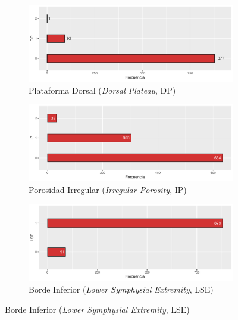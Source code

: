 \begin{figure}[p]
    \ContinuedFloat

    \begin{subfigure}{\textwidth}
        \includegraphics[width=\linewidth]{../../scripts/eda/eda_univar/char_dp_distr.pdf}
        \caption{Plataforma Dorsal (\textit{Dorsal Plateau}, DP)}
        \label{fig4:todd_chars__dp}
    \end{subfigure}

    \begin{subfigure}{\textwidth}
        \includegraphics[width=\linewidth]{../../scripts/eda/eda_univar/char_ip_distr.pdf}
        \caption{Porosidad Irregular (\textit{Irregular Porosity}, IP)}
        \label{fig4:todd_chars__ip}
    \end{subfigure}

    \begin{subfigure}{\textwidth}
        \includegraphics[width=\linewidth]{../../scripts/eda/eda_univar/char_lse_distr.pdf}
        \caption{Borde Inferior (\textit{Lower Symphysial Extremity}, LSE)}
        \label{fig4:todd_chars__lse}
    \end{subfigure}

    \label{fig4:todd_chars}
\end{figure}
